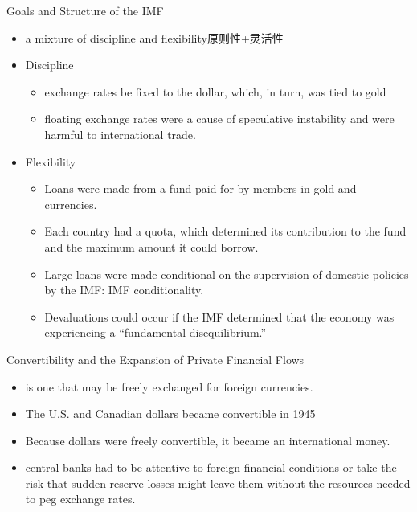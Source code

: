 \documentclass[10pt,hyperref={CJKbookmarks=true},xcolor=dvipsnames,aspectratio=169]{beamer}
\begin{document}
\begin{frame}{Goals and Structure of the IMF}
	\begin{itemize}
		\item a mixture of discipline and flexibility原则性+灵活性
		\item Discipline
			\begin{itemize}
				\item exchange
				rates be fixed to the dollar, which, in turn, was tied to gold
				\item floating exchange rates were a cause of speculative
				instability and were harmful to international trade.
				
			\end{itemize}
		\item Flexibility
			\begin{itemize}
				\item Loans were made from a fund paid for by members in gold
				and currencies.
				\item Each country had a quota, which determined its
				contribution to the fund and the maximum amount it could
				borrow.
				\item Large loans were made conditional on the supervision of
				domestic policies by the IMF: IMF conditionality.
				\item Devaluations could occur if the IMF determined that the				economy was experiencing a “fundamental
				disequilibrium.”
			\end{itemize}
	\end{itemize}
\end{frame}

\begin{frame}{Convertibility and the Expansion of Private Financial Flows}
	\begin{itemize}
		\item {} is one that may be freely exchanged for foreign		currencies.
		\item The U.S. and Canadian dollars became convertible in 1945
		\item Because dollars were freely convertible, it became an
		international money.
		\item central banks had
		to be attentive to foreign financial conditions or take the risk that sudden reserve losses
		might leave them without the resources needed to peg exchange rates.
	\end{itemize}
\end{frame}
\end{document}
